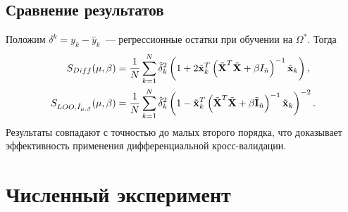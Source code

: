 \documentclass[unicode,lefteqn,c,hyperref={pdfpagelabels=false}]{beamer}
\begin{document}
\subsection{Сравнение результатов}
\begin{frame}{}
	Положим $\delta^k = y_k - \hat y_k$~--- регрессионные остатки при обучении на $\Omega^*$.
	Тогда
	\begin{align*}
		S_{Diff}({\mu,\beta})
			&= \frac1N\sum\limits_{k=1}^N
			\hat{\delta}_k^2
			\left(1 + 2\tilde {\boldsymbol{\mathbf{x}}}_k^T \left(\tilde{\boldsymbol{\mathbf{X}}}^T \tilde{\boldsymbol{\mathbf{X}}} + \beta I_{\hat n}\right)^{-1}\tilde{\boldsymbol{\mathbf{x}}}_k\right), \\
		S_{LOO, \hat I_{\mu,\beta}}({\mu,\beta})
			&= \frac1N\sum\limits_{k=1}^N
				\hat{\delta}_k^2
				\left(
				1 -
				\tilde{\boldsymbol{\mathbf{x}}}_k^T
				\left(\tilde{\boldsymbol{\mathbf{X}}}^T\tilde{\boldsymbol{\mathbf{X}}} + \beta \tilde{\boldsymbol{\mathbf{I}}}_{\hat n}\right)^{-1}
				\tilde{\boldsymbol{\mathbf{x}}}_k
				\right)^{-2}.
	\end{align*}
	Результаты совпадают с точностью до малых второго порядка, что доказывает эффективность применения дифференциальной кросс-валидации.
\end{frame}

\newcommand\addcolumn[3]{
	\column{0.33\textwidth}
		\texttt{[image: ../graph/\#1.png]}
		\vspace{10pt}
		\begin{center}
			\vspace{-25pt}
			$#2$
			\vspace{-5pt}
			\begin{align*}
			#3.
			\end{align*}
		\end{center}
}

\section{Численный эксперимент}
\end{document}
